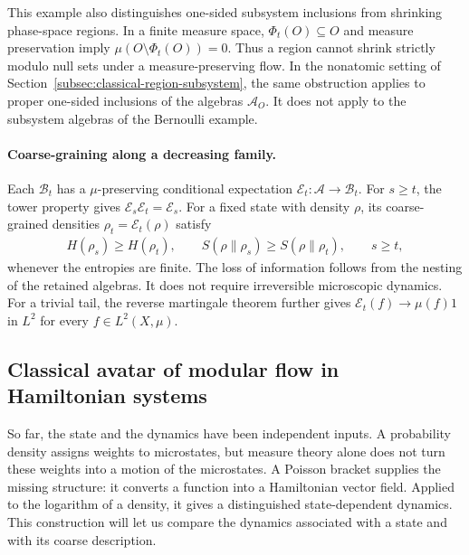 \documentclass[a4paper,11pt]{article}
\theoremstyle{definition}
\theoremstyle{remark}
\newcommand{\mA}{\mathcal{A}}
\newcommand{\mB}{\mathcal{B}}
\begin{document}
This example also distinguishes one-sided subsystem inclusions from shrinking
phase-space regions.  In a finite measure space, $\Phi_t(O)\subseteq O$ and measure
preservation imply $\mu(O\setminus\Phi_t(O))=0$.  Thus a region cannot shrink
strictly modulo null sets under a measure-preserving flow.  In the nonatomic setting
of Section~\ref{subsec:classical-region-subsystem}, the same obstruction applies to
proper one-sided inclusions of the algebras $\mA_O$.  It does not apply to the
subsystem algebras of the Bernoulli example.
 
\paragraph{Coarse-graining along a decreasing family.}
Each $\mB_t$ has a $\mu$-preserving conditional expectation $\mathcal{E}_t:\mA\to\mB_t$.
For $s\geq t$, the tower property gives $\mathcal{E}_s\mathcal{E}_t=\mathcal{E}_s$.
For a fixed state with density $\rho$, its coarse-grained densities $\rho_t=\mathcal{E}_t(\rho)$ satisfy
\begin{align}
    H(\rho_s)\geq H(\rho_t),\qquad
    S(\rho\|\rho_s)\geq S(\rho\|\rho_t),\qquad s\geq t,
\end{align}
whenever the entropies are finite.  The loss of information follows from the nesting of
the retained algebras.  It does not require irreversible microscopic dynamics.  For a
trivial tail, the reverse martingale theorem further gives
$\mathcal{E}_t(f)\to\mu(f)1$ in $L^2$ for every $f\in L^2(X,\mu)$.
 
\subsection{Classical avatar of modular flow in Hamiltonian systems}%
\label{subsec:classical-state-flow}
 
So far, the state and the dynamics have been independent inputs.  A probability density
assigns weights to microstates, but measure theory alone does not turn these weights
into a motion of the microstates.  A Poisson bracket supplies the missing structure: it
converts a function into a Hamiltonian vector field.  Applied to the logarithm of a
density, it gives a distinguished state-dependent dynamics.  This construction will let
us compare the dynamics associated with a state and with its coarse description.
 
\end{document}
